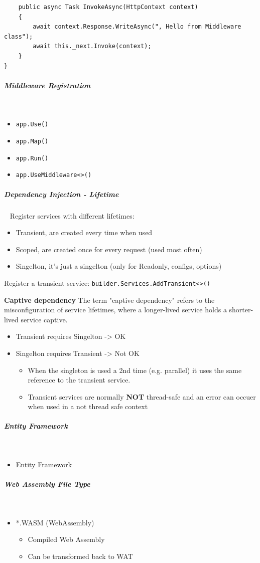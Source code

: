 \documentclass[11pt,twoside,landscape]{article}
\begin{document}
\begin{multicols}{3}
\begin{verbatim}
    public async Task InvokeAsync(HttpContext context)
    {
        await context.Response.WriteAsync(", Hello from Middleware class");
        await this._next.Invoke(context);
    }
}
\end{verbatim}
\subparagraph{Middleware Registration} \
\label{sec:org897f73d}
\begin{itemize}
\item \texttt{app.Use()}
\item \texttt{app.Map()}
\item \texttt{app.Run()}
\item \texttt{app.UseMiddleware<>()}
\end{itemize}
\subparagraph{Dependency Injection - Lifetime} \
\label{sec:orge2a35b4}
Register services with different lifetimes:
\begin{itemize}
\item Transient, are created every time when used
\item Scoped, are created once for every request (used most often)
\item Singelton, it's just a singelton (only for Readonly, configs, options)
\end{itemize}


Register a transient service: \texttt{builder.Services.AddTransient<>()}


\textbf{Captive dependency}
The term "captive dependency" refers to the misconfiguration of service lifetimes, where a longer-lived service holds a shorter-lived service captive.
\begin{itemize}
\item Transient requires Singelton -> OK
\item Singelton requires Transient -> Not OK
\begin{itemize}
\item When the singleton is used a 2nd time (e.g. parallel) it uses the same reference to the transient service.
\item Transient services are normally \textbf{NOT} thread-safe and an error can occuer when used in a not thread safe context
\end{itemize}
\end{itemize}
\subparagraph{Entity Framework} \
\label{sec:orgc72bc2e}
\begin{itemize}
\item \href{../../../roam/20220108180326-entity_framework.org}{Entity Framework}
\end{itemize}
\subparagraph{Web Assembly File Type} \
\label{sec:orgf5fb818}
\begin{itemize}
\item *.WASM (WebAssembly)
\begin{itemize}
\item Compiled Web Assembly
\item Can be transformed back to WAT
\end{itemize}


\end{itemize}
\end{multicols}
\end{document}
